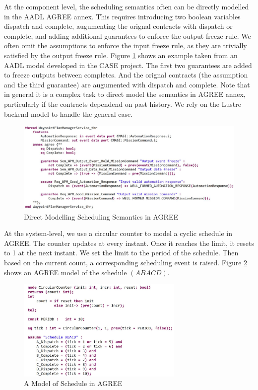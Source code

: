 At the component level, the scheduling semantics often can be directly modelled in the AADL AGREE annex. This requires introducing two boolean variables dispatch and complete, augumenting the orignal contracts with dispatch or complete, and adding additional guarantees to enforce the output freeze rule. We often omit the assumptions to enforce the input freeze rule, as they are trivially satisfied by the output freeze rule.
Figure \ref{wpmAGREE} shows an example taken from an AADL model developed in the CASE project. The first two guarantees are added to freeze outputs between completes. And the orignal contracts (the assumption and the third guarantee) are augumented with dispatch and complete.
Note that in general it is a complex task to direct model the semantics in AGREE annex, particularly if the contracts dependend on past history. We rely on the Lustre backend model to handle the general case.

\begin{figure}[ht!]
\centering
\includegraphics[width=130mm]{wpmAGREE3.jpg}
\caption{Direct Modelling Scheduling Semantics in AGREE\label{wpmAGREE}}
\end{figure}

At the system-level, we use a circular counter to model a cyclic schedule in AGREE. 
The counter updates at every instant. Once it reaches the limit, it resets to 1 at the next instant.
We set the limit to the period of the schedule. 
Then based on the current count, a corresponding scheduling event is raised.
Figure \ref{schedule} shows an AGREE model of the schedule $(ABACD)$.

\begin{figure}[ht!]
\centering
\includegraphics[width=80mm]{schedule.jpg}
\caption{A Model of Schedule in AGREE\label{schedule}}
\end{figure}

